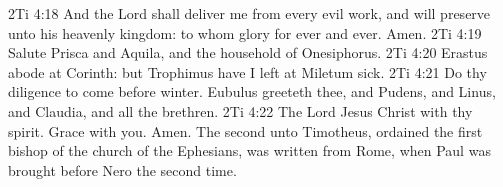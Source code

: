 \vs 2Ti 4:18 And the Lord shall deliver me from every evil work, and will preserve  unto his heavenly kingdom: to whom  glory for ever and ever. Amen.
\vs 2Ti 4:19 Salute Prisca and Aquila, and the household of Onesiphorus.
\vs 2Ti 4:20 Erastus abode at Corinth: but Trophimus have I left at Miletum sick.
\vs 2Ti 4:21 Do thy diligence to come before winter. Eubulus greeteth thee, and Pudens, and Linus, and Claudia, and all the brethren.
\vs 2Ti 4:22 The Lord Jesus Christ  with thy spirit. Grace  with you. Amen. The second  unto Timotheus, ordained the first bishop of the church of the Ephesians, was written from Rome, when Paul was brought before Nero the second time.
